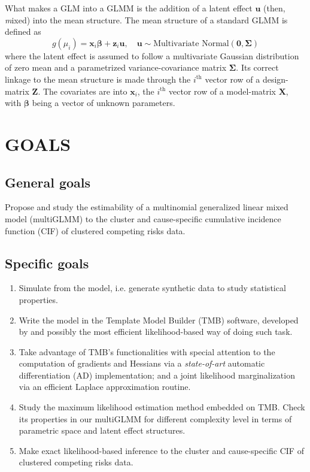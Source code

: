 What makes a GLM into a GLMM \cite{GLMM} is the addition of a latent
effect \(\bm{u}\) (then, \textit{m}ixed) into the mean structure. The
mean structure of a standard GLMM is defined as
\[
  g(\mu_{i}) = \bm{x}_{i}\bm{\beta} + \bm{z}_{i}\bm{u},
  \quad \bm{u} \sim \text{Multivariate Normal}(\bm{0},\bm{\Sigma})
\]
where the latent effect is assumed to follow a multivariate Gaussian
distribution of zero mean and a parametrized variance-covariance matrix
\(\bm{\Sigma}\). Its correct linkage to the mean structure is made
through the \(i^\text{th}\) vector row of a design-matrix \(\bm{Z}\).
The covariates are into \(\bm{x}_{i}\), the \(i^\text{th}\) vector row
of a model-matrix \(\bm{X}\), with \(\bm{\beta}\) being a vector of
unknown parameters.

\section{GOALS}

\subsection{General goals}

Propose and study the estimability of a multinomial generalized linear
mixed model (multiGLMM) to the cluster and cause-specific cumulative
incidence function (CIF) of clustered competing risks data.

\subsection{Specific goals}

\begin{enumerate}
 \item Simulate from the model, i.e. generate synthetic data to study
       statistical properties.

 \item Write the model in the Template Model Builder (TMB) software,
       developed by  and possibly the most efficient
       likelihood-based way of doing such task.

 \item Take advantage of TMB's functionalities with special attention to
       the computation of gradients and Hessians via a
       \textit{state-of-art} automatic differentiation (AD)
       implementation; and a joint likelihood marginalization via an
       efficient Laplace approximation routine.

 \item Study the maximum likelihood estimation method embedded on TMB.
       Check its properties in our multiGLMM for different complexity
       level in terms of parametric space and latent effect structures.

 \item Make exact likelihood-based inference to the cluster and
       cause-specific CIF of clustered competing risks data.
\end{enumerate}

